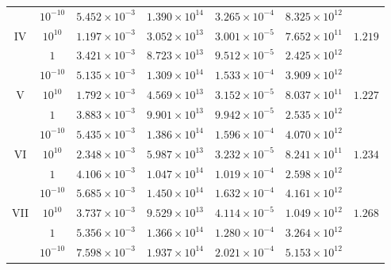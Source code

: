 \documentclass[twocolumn,aps,showpacs,showkeys,prd,superscriptaddress,byrevtex, amsmath]{revtex4-1}
\begin{document}
\begin{table*}[t]
\begin{tabular}{c c c c c c c}
  & $10^{-10}$ & $5.452 \times 10^{-3}$ & $1.390 \times 10^{14}$  & $3.265 \times 10^{-4}$ & $8.325 \times 10^{12}$ & \\ 

IV & $10^{10}$ & $1.197 \times 10^{-3}$ & $3.052 \times 10^{13}$  & $3.001 \times 10^{-5}$ & $7.652 \times 10^{11}$ & $1.219$ \\ 

  & $1$ & $3.421 \times 10^{-3}$ & $8.723 \times 10^{13}$  & $9.512 \times 10^{-5}$ & $2.425 \times 10^{12}$ & \\ 

  & $10^{-10}$ & $5.135 \times 10^{-3}$ & $1.309 \times 10^{14}$ & $1.533 \times 10^{-4}$ & $3.909 \times 10^{12}$ & \\ 
 
V  & $10^{10}$ & $1.792 \times 10^{-3}$ & $4.569 \times 10^{13}$  & $3.152 \times 10^{-5}$ & $8.037 \times 10^{11}$ & $1.227$\\ 

  & $1$ & $3.883 \times 10^{-3}$ & $9.901 \times 10^{13}$  & $9.942 \times 10^{-5}$ & $2.535 \times 10^{12}$ & \\ 

  & $10^{-10}$ & $5.435 \times 10^{-3} $ & $1.386 \times 10^{14}$  & $1.596 \times 10^{-4}$ & $4.070 \times 10^{12}$ & \\ 

VI & $10^{10}$ & $2.348 \times 10^{-3}$ & $5.987 \times 10^{13}$  & $3.232 \times 10^{-5}$ & $8.241 \times 10^{11}$ & $1.234$\\ 

  & $1$ & $4.106 \times 10^{-3}$ & $1.047 \times 10^{14}$  & $1.019 \times 10^{-4}$ & $2.598 \times 10^{12}$ & \\ 

  & $10^{-10}$ & $5.685 \times 10^{-3}$ & $1.450 \times 10^{14}$ & $1.632 \times 10^{-4}$ & $4.161 \times 10^{12}$ & \\ 

VII  & $10^{10}$ & $3.737 \times 10^{-3}$ & $9.529 \times 10^{13}$ & $4.114 \times 10^{-5}$ & $1.049 \times 10^{12}$ & $1.268$\\ 

  & $1$ & $5.356 \times 10^{-3}$ & $1.366 \times 10^{14}$ & $1.280 \times 10^{-4}$ & $3.264 \times 10^{12}$ & \\ 

  & $10^{-10}$ & $7.598 \times 10^{-3}$ & $1.937 \times 10^{14}$ & $2.021 \times 10^{-4}$ & $5.153 \times 10^{12}$ & \\ 
 \hline\hline   
\end{tabular}
\end{table*}
\end{document}
